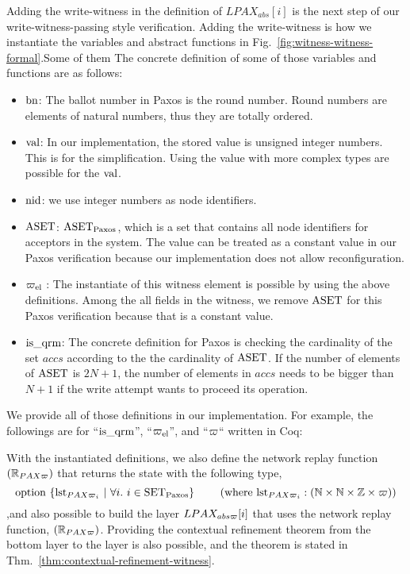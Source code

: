 Adding the write-witness in the definition of $LPAX_{abs}[i]$
is the next step of our write-witness-passing style verification. 
Adding the write-witness is how we instantiate the variables and abstract functions in Fig.~\ref{fig:witness-witness-formal}.Some of them
The concrete definition of some of those variables and functions are as follows:
\begin{itemize}
\item $\mathrm{bn}$: The ballot number in Paxos is the round number. Round numbers are elements of natural numbers, thus 
they are totally ordered. 
\item $\mathrm{val}$: In our implementation, the stored value is unsigned integer numbers. This is for the simplification. Using the value with more
complex types are possible for the $\mathrm{val}$.  
\item $\mathrm{nid}$: we use  integer numbers as node identifiers. 
\item $\mathrm{ASET}$: $\mathrm{ASET}_{\mathrm{Paxos}}$, which is a set that contains all node identifiers for acceptors in the system. The value can be treated as 
a constant value in our Paxos verification because our implementation does not allow reconfiguration.
\item $\varpi_{\mathrm{el}}$ : The instantiate of this witness element is possible by using the above definitions. Among the all fields in 
the witness, we remove $\mathrm{ASET}$ for this Paxos verification because that is a constant value.
\item $\mathrm{is}\_\mathrm{qrm}$: The concrete definition for Paxos is checking the cardinality of the set $accs$ according to the 
the cardinality of $\mathrm{ASET}$. If the number of elements of $\mathrm{ASET}$ is $2N + 1$, the number of elements in $accs$ 
needs to be bigger than  $N + 1$ if the write attempt wants to proceed its operation.
\end{itemize}

We provide all of those definitions in our implementation. 
For example, the followings are for ``$\mathrm{is}\_\mathrm{qrm}$'', ``$\varpi_{\mathrm{el}}$'', and ``$\varpi$`` written in Coq:


With the instantiated definitions, we also define  the network replay function $(\mathbb{R}_{PAX\varpi})$ that returns the state with the following type,
$$\mbox{option} \ \{\lstate{{PAX\witness}_i}~\vert~ \forall i.\ i \in \paxset\} \ \ \ \ \ \ \ (\mbox{where}\ \lstate{{PAX\witness}_i} : 
(\mathbb{N} \times \mathbb{N} \times \mathbb{Z} \times \witness))$$
,and also possible to build the layer $LPAX_{abs\varpi}[i]$ that uses the network replay function, $(\mathbb{R}_{PAX\varpi})$.
Providing the contextual refinement theorem from the bottom layer to the layer is also possible, and the theorem is
stated in Thm.~\ref{thm:contextual-refinement-witness}.

